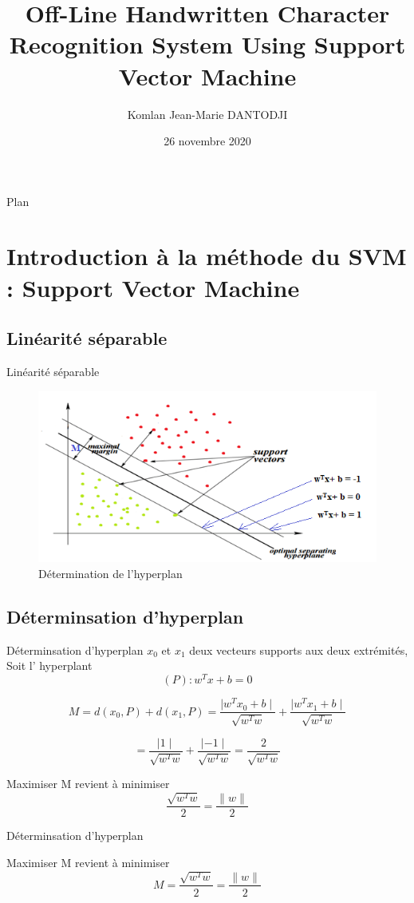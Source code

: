 \documentclass{beamer}
\title[Reconnaissance de caractères manuscrites] 
{Off-Line Handwritten Character Recognition System Using Support Vector Machine}
\author[Komlan Dantodji] 
{Komlan Jean-Marie DANTODJI}
\institute[]
{
  Etudiant en M1 Big Data
  \and
  Université Paris 8}
\date{26 novembre 2020}
\begin{document}
\begin{frame}
  \titlepage
\end{frame}

\begin{frame}{Plan}
  \tableofcontents
\end{frame}
\section{Introduction à la méthode du SVM : Support Vector Machine}
\subsection{Linéarité séparable}
\begin{frame}{Linéarité séparable}
	\begin{figure}[H]
    \includegraphics[width=\linewidth]{images/svm_separate.png}
    \caption{Détermination de l’hyperplan}
    \label{fig:L1}
\end{figure}
\end{frame}

\subsection{Déterminsation d'hyperplan}
\begin{frame}{Déterminsation d'hyperplan}
 $x_0$ et $x_1$ deux vecteurs supports aux deux extrémités,\\
Soit l' hyperplant $$(P): w^Tx+b=0$$

$$M = d(x_{0},P)+d(x_{1},P) = \frac{\mid{w^{T}x_{0}+b}\mid}{\sqrt{w^{T}w} } + \frac{\mid{w^{T}x_{1}+b}\mid}{\sqrt{w^{T}w} } $$

$$ = \frac{\mid{1}\mid}{\sqrt{w^{T}w} } + \frac{\mid{-1}\mid}{\sqrt{w^{T}w}} = \frac{2}{\sqrt{w^{T}w} }$$  
\par Maximiser M revient à minimiser $$\frac{\sqrt{w^{T}w}}{2} = \frac{\|w\|}{2}$$
\end{frame}
\begin{frame}{Déterminsation d'hyperplan}
\par Maximiser M revient à minimiser $$M=\frac{\sqrt{w^{T}w}}{2} = \frac{\|w\|}{2}$$
\end{frame}
\end{document}
